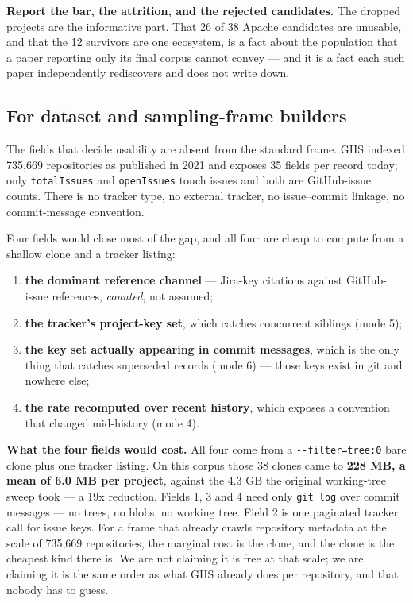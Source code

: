 \documentclass[11pt,a4paper]{article}
\begin{document}
\textbf{Report the bar, the attrition, and the rejected candidates.} The dropped projects are the informative part. That 26 of 38 Apache candidates are unusable, and that the 12 survivors are one ecosystem, is a fact about the population that a paper reporting only its final corpus cannot convey --- and it is a fact each such paper independently rediscovers and does not write down.

\subsection{For dataset and sampling-frame builders}
\label{sec:7.2}

The fields that decide usability are absent from the standard frame. GHS indexed 735,669 repositories as published in 2021 and exposes 35 fields per record today; only \texttt{totalIssues} and \texttt{openIssues} touch issues and both are GitHub-issue counts. There is no tracker type, no external tracker, no issue--commit linkage, no commit-message convention.

Four fields would close most of the gap, and all four are cheap to compute from a shallow clone and a tracker listing:

\begin{enumerate}
\item \textbf{the dominant reference channel} --- Jira-key citations against GitHub-issue references, \emph{counted}, not assumed;
\item \textbf{the tracker's project-key set}, which catches concurrent siblings (mode 5);
\item \textbf{the key set actually appearing in commit messages}, which is the only thing that catches superseded records (mode 6) --- those keys exist in git and nowhere else;
\item \textbf{the rate recomputed over recent history}, which exposes a convention that changed mid-history (mode 4).
\end{enumerate}

\textbf{What the four fields would cost.} All four come from a \texttt{-\allowbreak{}-\allowbreak{}filter=tree:0} bare clone plus one tracker listing. On this corpus those 38 clones came to \textbf{228 MB, a mean of 6.0 MB per project}, against the 4.3 GB the original working-tree sweep took --- a 19x reduction. Fields 1, 3 and 4 need only \texttt{git log} over commit messages --- no trees, no blobs, no working tree. Field 2 is one paginated tracker call for issue keys. For a frame that already crawls repository metadata at the scale of 735,669 repositories, the marginal cost is the clone, and the clone is the cheapest kind there is. We are not claiming it is free at that scale; we are claiming it is the same order as what GHS already does per repository, and that nobody has to guess.
\end{document}
